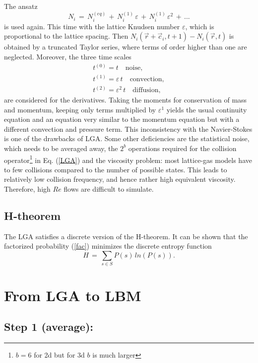 The ansatz
\begin{equation}
  N_i \,=\, N_i^{(eq)} \,+\, N_i^{(1)} \, \varepsilon \,+\, N_i^{(1)} \, \varepsilon^2 \,+\, ...\nonumber
\end{equation}
is used again. This time with the lattice Knudsen number $\varepsilon$, which is proportional to the lattice spacing. Then $N_i(\vec r + \vec c_i, t+1)-N_i(\vec r , t)$ is obtained by a truncated Taylor series, where terms of order higher than one are neglected. Moreover, the three time scales
\begin{eqnarray}
  t^{(0)} = t \quad \mbox{noise}, \nonumber \\
  t^{(1)} = \varepsilon \,t \quad \mbox{convection}, \nonumber \\
  t^{(2)} = \varepsilon^2 \,t \quad \mbox{diffusion}, \nonumber
\end{eqnarray}
are considered for the derivatives. Taking the moments for conservation of mass and momentum, keeping only terms multiplied by $\varepsilon^1$ yields the usual continuity equation and an equation very similar to the momentum equation but with a different convection and pressure term. This inconsistency with the Navier-Stokes is one of the drawbacks of LGA. Some other deficiencies are the statistical noise, which needs to be averaged away, the $2^b$ operations required for the collision operator\footnote{$b=6$ for 2d but for 3d $b$ is much larger} in Eq. (\ref{LGA}) and the viscosity problem: most lattice-gas models have to few collisions compared to the number of possible states. This leads to relatively low collision frequency, and hence rather high equivalent viscosity. Therefore, high $Re$ flows are difficult to simulate.

\subsection{H-theorem}

The LGA satisfies a discrete version of the H-theorem. It can be shown that the factorized probability (\ref{fac}) minimizes the discrete entropy function
\begin{equation}
 H \,=\, \sum_{s \in S} P(s)\, ln \left(P(s)\right). \nonumber
\end{equation}


\section{From LGA to LBM}

\subsection{Step 1 (average):}

